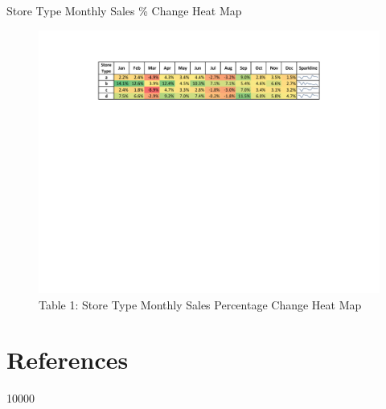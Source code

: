 \documentclass[pdf]{beamer}
\theoremstyle{remark}
\theoremstyle{definition}
\begin{document}
\begin{frame}[t]{Store Type Monthly Sales \% Change Heat Map}
\begin{figure}[htbp]
    \centering
    \captionsetup{justification=centering}
    \includegraphics[clip, trim=4.9cm 15.5cm 0cm 2.5cm, width=1.25\textwidth]{Heat_Map_Unit_3.pdf}  
    \caption{Table {\color{franklinblue} 1}: Store Type Monthly Sales Percentage Change Heat Map}
    \label{fig:heatmap}
\end{figure}
\end{frame}

\section{References}

\begin{frame}[t,allowframebreaks]
 10000
\small


\end{frame}
\end{document}
